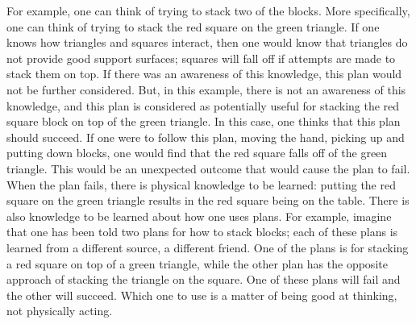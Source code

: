 For example, one can think of trying to stack two of the blocks.  More
specifically, one can think of trying to stack the red square on the
green triangle.  If one knows how triangles and squares interact, then
one would know that triangles do not provide good support surfaces;
squares will fall off if attempts are made to stack them on top.  If
there was an awareness of this knowledge, this plan would not be
further considered.  But, in this example, there is not an awareness
of this knowledge, and this plan is considered as potentially useful
for stacking the red square block on top of the green triangle.  In
this case, one thinks that this plan should succeed.  If one were to
follow this plan, moving the hand, picking up and putting down blocks,
one would find that the red square falls off of the green triangle.
This would be an unexpected outcome that would cause the plan to fail.
When the plan fails, there is physical knowledge to be learned:
putting the red square on the green triangle results in the red square
being on the table.  There is also knowledge to be learned about how
one uses plans.  For example, imagine that one has been told two plans
for how to stack blocks; each of these plans is learned from a
different source, a different friend.  One of the plans is for
stacking a red square on top of a green triangle, while the other plan
has the opposite approach of stacking the triangle on the square.  One
of these plans will fail and the other will succeed.  Which one to use
is a matter of being good at thinking, not physically acting.
